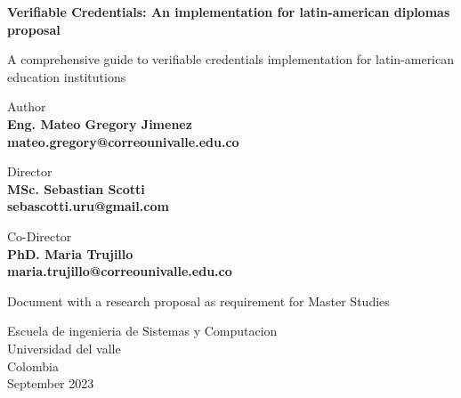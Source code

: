 \begin{titlepage}
    \begin{center}
        \vspace*{1cm}

        \huge
        \textbf{Verifiable Credentials: An implementation for latin-american diplomas proposal}

        \vspace{0.5cm}
        \large
        A comprehensive guide to verifiable credentials implementation for latin-american education institutions

        \vspace{1.5cm}

        Author\\
        \textbf{Eng. Mateo Gregory Jimenez}\\
        \textbf{mateo.gregory@correounivalle.edu.co}

        \vspace{1cm}
        
        Director\\
        \textbf{MSc. Sebastian Scotti}\\
        \textbf{sebascotti.uru@gmail.com}

        \vspace{1cm}
        
        Co-Director\\
        \textbf{PhD. Maria Trujillo}\\
        \textbf{maria.trujillo@correounivalle.edu.co}

        \vfil
        
        Document with a research proposal as requirement for Master Studies
        
        \vspace{0.8cm}

        Escuela de ingenieria de Sistemas y Computacion\\
        Universidad del valle\\
        Colombia\\
        September 2023
    \end{center}
\end{titlepage}
